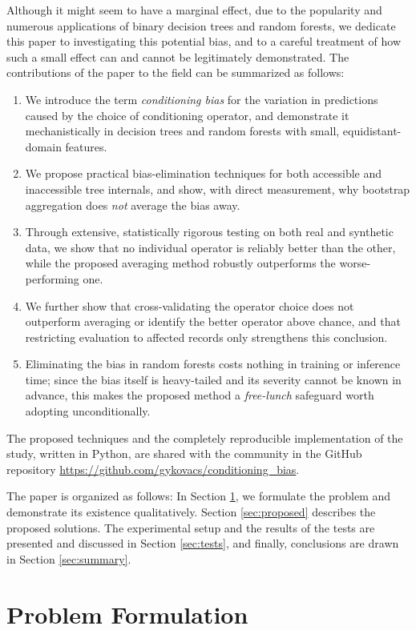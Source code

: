 \documentclass[5p,twocolumn,authoryear]{elsarticle}
\theoremstyle{plain}%
\theoremstyle{remark}%
\theoremstyle{definition}%
\begin{document}
Although it might seem to have a marginal effect, due to the popularity and numerous applications of binary decision trees and random forests, we dedicate this paper to investigating this potential bias, and to a careful treatment of how such a small effect can and cannot be legitimately demonstrated.
The contributions of the paper to the field can be summarized as follows:
\begin{enumerate}
\item We introduce the term \emph{conditioning bias} for the variation in predictions caused by the choice of conditioning operator, and demonstrate it mechanistically in decision trees and random forests with small, equidistant-domain features.
\item We propose practical bias-elimination techniques for both accessible and inaccessible tree internals, and show, with direct measurement, why bootstrap aggregation does \emph{not} average the bias away.
\item Through extensive, statistically rigorous testing on both real and synthetic data, we show that no individual operator is reliably better than the other, while the proposed averaging method robustly outperforms the worse-performing one.
\item We further show that cross-validating the operator choice does not outperform averaging or identify the better operator above chance, and that restricting evaluation to affected records only strengthens this conclusion.
\item Eliminating the bias in random forests costs nothing in training or inference time; since the bias itself is heavy-tailed and its severity cannot be known in advance, this makes the proposed method a \emph{free-lunch} safeguard worth adopting unconditionally.
\end{enumerate}
The proposed techniques and the completely reproducible implementation of the study, written in Python, are shared with the community in the GitHub repository \url{https://github.com/gykovacs/conditioning_bias}.

The paper is organized as follows: In Section \ref{sec:problem}, we formulate the problem and demonstrate its existence qualitatively. Section \ref{sec:proposed} describes the proposed solutions. The experimental setup and the results of the tests are presented and discussed in Section \ref{sec:tests}, and finally, conclusions are drawn in Section \ref{sec:summary}.

\section{Problem Formulation}
\label{sec:problem}
\end{document}
